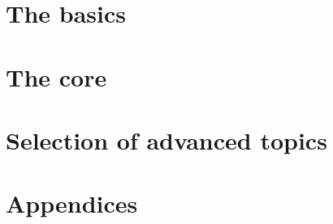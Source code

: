 \documentclass[10pt,a4paper,footinclude=true,headinclude=true]{scrbook}
\theoremstyle{classicdef}
\theoremstyle{remark}
\begin{document}
\pagestyle{plain}



\pagestyle{scrheadings}


\cleardoublepage
\cleardoublepage
\cleardoublepage
\mainmatter
\cleardoublepage
{}
\part{The basics}




\cleardoublepage
\part{The core}





\cleardoublepage
\part{Selection of advanced topics}






\cleardoublepage
\part{Appendices}
\appendix




\end{document}
